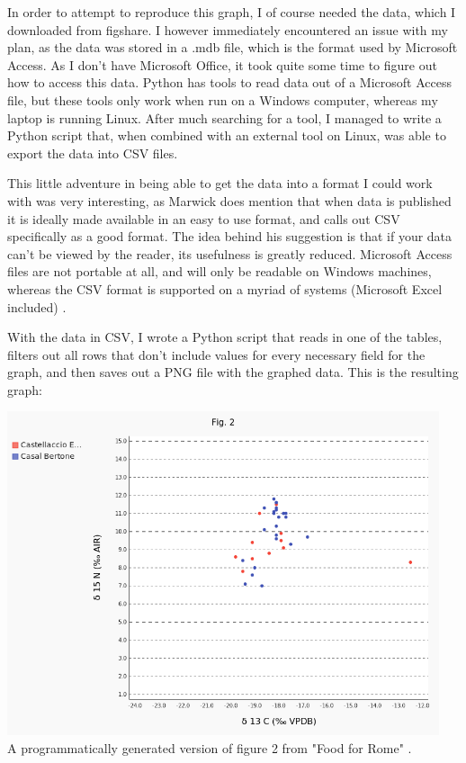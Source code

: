 \documentclass[12pt]{article}
\begin{document}
In order to attempt to reproduce this graph, I of course needed the data, which
I downloaded from figshare. I however immediately encountered an issue with my
plan, as the data was stored in a .mdb file, which is the format used by
Microsoft Access. As I don't have Microsoft Office, it took quite some time to
figure out how to access this data. Python has tools to read data out of a
Microsoft Access file, but these tools only work when run on a Windows
computer, whereas my laptop is running Linux. After much searching for a tool,
I managed to write a Python script that, when combined with an external tool on
Linux, was able to export the data into CSV files.

This little adventure in being able to get the data into a format I could work
with was very interesting, as Marwick does mention that when data is published
it is ideally made available in an easy to use format, and calls out CSV
specifically as a good format. The idea behind his suggestion is that if your
data can't be viewed by the reader, its usefulness is greatly reduced.
Microsoft Access files are not portable at all, and will only be readable on
Windows machines, whereas the CSV format is supported on a myriad of systems
(Microsoft Excel included) \cite{marwick16}.

With the data in CSV, I wrote a Python script that reads in one of the tables,
filters out all rows that don't include values for every necessary field for
the graph, and then saves out a PNG file with the graphed data. This is the
resulting graph:

\begin{center}
    \includegraphics[width=5in, keepaspectratio]{fig2} \\
    A programmatically generated version of figure 2 from "Food for Rome"
    \cite{killgrove13}.
\end{center}
\end{document}
